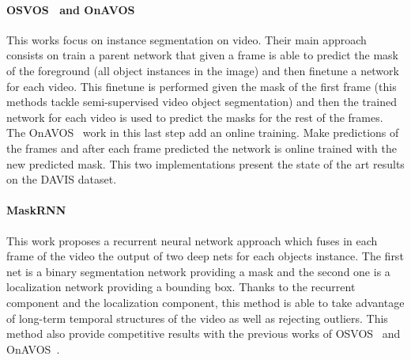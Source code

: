 \paragraph{OSVOS~\cite{caelles2017one} and OnAVOS~\cite{voigtlaender17BMVC}}
This works focus on instance segmentation on video.
Their main approach consists on train a parent network that given a frame is able to predict the mask of the foreground (all object instances in the image) and then finetune a network for each video.
This finetune is performed given the mask of the first frame (this methods tackle semi-supervised video object segmentation) and then the trained network for each video is used to predict the masks for the rest of the frames.
The OnAVOS~\cite{voigtlaender17BMVC} work in this last step add an online training. Make predictions of the frames and after each frame predicted the network is online trained with the new predicted mask.
This two implementations present the state of the art results on the DAVIS dataset.

\paragraph{MaskRNN~\cite{NIPS2017_6636}}
This work proposes a recurrent neural network approach which fuses in each frame of the video the output of two deep nets for each objects instance.
The first net is a binary segmentation network providing a mask and the second one is a localization network providing a bounding box.
Thanks to the recurrent component and the localization component, this method is able to take advantage of long-term temporal structures of the video as well as rejecting outliers.
This method also provide competitive results with the previous works of OSVOS~\cite{caelles2017one} and OnAVOS~\cite{voigtlaender17BMVC}.



